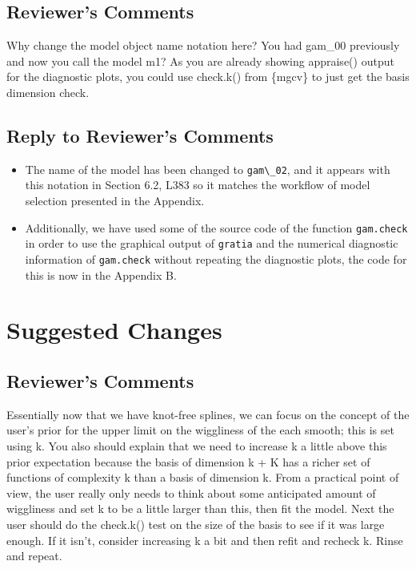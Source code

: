 \documentclass[
]{article}
\newcommand{\passthrough}[1]{#1}
\begin{document}
\hypertarget{reviewers-comments-11}{%
\subsection{Reviewer's Comments}\label{reviewers-comments-11}}

Why change the model object name notation here? You had gam\_00 previously and now you call the model m1? As you are already showing appraise() output for the diagnostic plots, you could use check.k() from \{mgcv\} to just get the basis dimension check.

\hypertarget{section-12}{%
\subsection{\texorpdfstring{\textcolor{reviewersblue} {Reply to Reviewer's Comments}}{}}\label{section-12}}

\begin{itemize}
\item
  The name of the model has been changed to \passthrough{\lstinline!gam\_02!}, and it appears with this notation in Section 6.2, L383 so it matches the workflow of model selection presented in the Appendix.
\item
  Additionally, we have used some of the source code of the function \passthrough{\lstinline!gam.check!} in order to use the graphical output of \passthrough{\lstinline!gratia!} and the numerical diagnostic information of \passthrough{\lstinline!gam.check!} without repeating the diagnostic plots, the code for this is now in the Appendix B.
\end{itemize}

\hypertarget{suggested-changes}{%
\section{Suggested Changes}\label{suggested-changes}}

\hypertarget{reviewers-comments-12}{%
\subsection{Reviewer's Comments}\label{reviewers-comments-12}}

Essentially now that we have knot-free splines, we can focus on the concept of the user's prior for the upper limit on the wiggliness of the each smooth; this is set using k. You also should explain that we need to increase k a little above this prior expectation because the basis of dimension k + K has a richer set of functions of complexity k than a basis of dimension k. From a practical point of view, the user really only needs to think about some anticipated amount of wiggliness and set k to be a little larger than this, then fit the model.
Next the user should do the check.k() test on the size of the basis to see if it was large enough. If it isn't, consider increasing k a bit and then refit and recheck k. Rinse and repeat.
\end{document}

